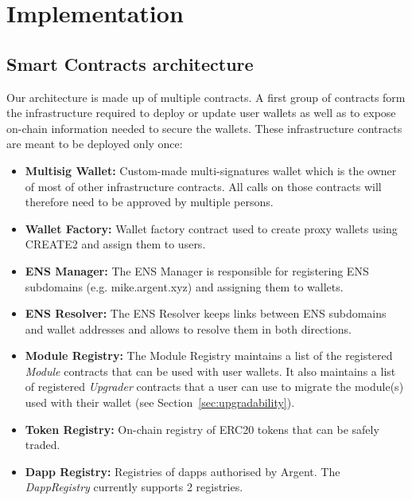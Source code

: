 \documentclass[12pt]{article}
\begin{document}
\section{Implementation}

\subsection{Smart Contracts architecture}


Our architecture is made up of multiple contracts. A first group of contracts form the infrastructure required to deploy or update user wallets as well as to expose on-chain information needed to secure the wallets. These infrastructure contracts are meant to be deployed only once:
\begin{itemize}
    \item \textbf{Multisig Wallet:} Custom-made multi-signatures wallet which is the owner of most of other infrastructure contracts. All calls on those contracts will therefore need to be approved by multiple persons.
    \item \textbf{Wallet Factory:} Wallet factory contract used to create proxy wallets using CREATE2 and assign them to users.
    \item \textbf{ENS Manager:} The ENS Manager is responsible for registering ENS subdomains (e.g. mike.argent.xyz) and assigning them to wallets.
    \item \textbf{ENS Resolver:} The ENS Resolver keeps links between ENS subdomains and wallet addresses and allows to resolve them in both directions.
    \item \textbf{Module Registry:} The Module Registry maintains a list of the registered \emph{Module} contracts that can be used with user wallets. It also maintains a list of registered \emph{Upgrader} contracts that a user can use to migrate the module(s) used with their wallet (see Section~\ref{sec:upgradability}).
    \item \textbf{Token Registry:} On-chain registry of ERC20 tokens that can be safely traded.  
    \item \textbf{Dapp Registry:} Registries of dapps authorised by Argent. The \emph{DappRegistry} currently supports 2 registries.
\end{itemize}
\end{document}
